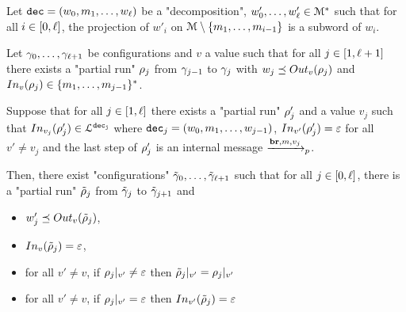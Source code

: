 \begin{lemma}
	\label{lem:follower-composition-output}
	Let $\decsymb = (w_0, m_1, \ldots, w_\ell)$ be a "decomposition", $w'_0, \ldots, w'_\ell \in \messages^*$ such that for all $i \in \nset{0}{\ell}$, the projection of $w'_i$ on $\messages\setminus \set{m_1, \ldots, m_{i-1}}$ is a subword of $w_i$.
	
	Let $\config_0, \ldots, \config_{\ell+1}$ be configurations and $v$ a value such that for all $j \in\nset{1}{\ell+1}$ there exists a "partial run" $\run_j$ from $\config_{j-1}$ to $\config_{j}$ with $w_j \subword \voutput{v}{\run_j}$ and $\vinput{v}{\run_j} \in \set{m_1,\ldots, m_{j-1}}^*$.
	
	Suppose that for all $j \in\nset{1}{\ell}$ there exists a "partial run" $\run'_j$ and a value $v_j$ such that $\vinput{v_j}{\run'_j} \in \langdec{\decsymb_j}$ where $\decsymb_j = (w_0, m_1, \ldots, w_{j-1})$, $\vinput{v'}{\run'_j} = \varepsilon$ for all $v' \neq v_j$ and the last step of $\run'_j$ is an internal message $\intmessage{m}{v_j}$.
	
	Then, there exist "configurations" $\Tilde{\config}_0, \ldots, \Tilde{\config}_{\ell+1}$ such that for all $j \in\nset{0}{\ell}$, there is a "partial run" $\Tilde{\run}_j$ from $\Tilde{\config}_j$ to $\Tilde{\config}_{j+1}$ and
\begin{itemize}
	\item $w'_j \subword \voutput{v}{\Tilde{\run}_j}$, 
	
	\item $\vinput{v}{\Tilde{\run}_j} = \varepsilon$,
	
	\item for all $v' \neq v$, if $\vproj{v'}{\run_j} \neq \varepsilon$ then $\vproj{v'}{\Tilde{\run}_j} = \vproj{v'}{\run_j}$
	
	\item for all $v' \neq v$, if $\vproj{v'}{\run_j} = \varepsilon$ then $\vinput{v'}{\Tilde{\run}_j} = \varepsilon$
\end{itemize}
\end{lemma}

